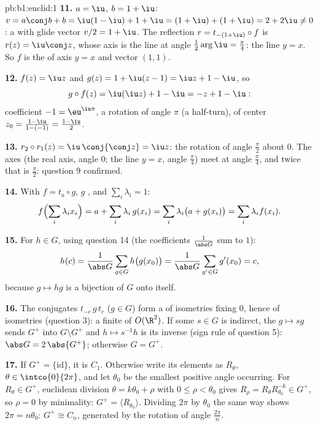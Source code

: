 \begin{solution}{pb:b1:euclid:1}
\textbf{11.} $a = \iu$, $b = 1 + \iu$: $v = a\conj b + b =
\iu(1 - \iu) + 1 + \iu = (1 + \iu) + (1 + \iu) = 2 + 2\iu \neq
0$: a  with glide vector $v/2 = 1 + \iu$. The
reflection $r = t_{-(1+\iu)}\circ f$ is $r(z) = \iu\conj z$,
whose axis is the line at angle $\frac12\arg\iu = \frac\pi4$:
the line $y = x$. So $f$ is the  of axis $y =
x$ and vector $(1, 1)$.

\textbf{12.} $f(z) = \iu z$ and $g(z) = 1 + \iu(z - 1) = \iu z
+ 1 - \iu$, so
\[
g\circ f(z) = \iu(\iu z) + 1 - \iu = -z + 1 - \iu :
\]
 coefficient $-1 = \eu^{\iu\pi}$, a rotation of angle
$\pi$ (a half-turn), of center $z_0 = \frac{1 - \iu}{1 - (-1)}
= \frac{1 - \iu}{2}$.

\textbf{13.} $r_2\circ r_1(z) = \iu\,\conj{\conj z} = \iu z$:
the rotation of angle $\frac\pi2$ about $0$. The axes (the real
axis, angle $0$; the line $y = x$, angle $\frac\pi4$) meet at
angle $\frac\pi4$, and twice that is $\frac\pi2$: question 9
confirmed.

\textbf{14.} With $f = t_a\circ g$, $g$ , and $\sum_i
\lambda_i = 1$:
\[
f\Bigl(\sum_i \lambda_i x_i\Bigr)
= a + \sum_i \lambda_i\,g(x_i)
= \sum_i \lambda_i\bigl(a + g(x_i)\bigr)
= \sum_i \lambda_i f(x_i) .
\]

\textbf{15.} For $h \in G$, using question 14 (the coefficients
$\frac1{\abs G}$ sum to $1$):
\[
h(c) = \frac{1}{\abs G}\sum_{g \in G} h\bigl(g(x_0)\bigr)
= \frac{1}{\abs G}\sum_{g' \in G} g'(x_0) = c ,
\]
because $g \mapsto hg$ is a bijection of $G$ onto itself.

\textbf{16.} The conjugates $t_{-c}\,g\,t_{c}$ ($g \in G$) form
a  of isometries fixing $0$, hence of \emph{}
isometries (question 3): a finite  of $O(\R^2)$. If
some $s \in G$ is indirect, the  $g \mapsto sg$ sends $G^+$
 into $G\setminus G^+$ and $h \mapsto s^{-1}h$ is its
inverse (sign rule of question 5): $\abs G = 2\,\abs{G^+}$;
otherwise $G = G^+$.

\textbf{17.} If $G^{+} = \{\mathrm{id}\}$, it is $C_1$.
Otherwise write its elements as $R_\theta$, $\theta \in
\intco{0}{2\pi}$, and let $\theta_0$ be the smallest positive
angle occurring. For $R_\theta \in G^{+}$, euclidean division
$\theta = k\theta_0 + \rho$ with $0 \leq \rho < \theta_0$ gives
$R_\rho = R_\theta R_{\theta_0}^{-k} \in G^{+}$, so $\rho = 0$
by minimality: $G^{+} = \langle R_{\theta_0}\rangle$. Dividing
$2\pi$ by $\theta_0$ the same way shows $2\pi = n\theta_0$:
$G^{+} \cong C_n$, generated by the rotation of angle
$\frac{2\pi}n$.


\end{solution}
